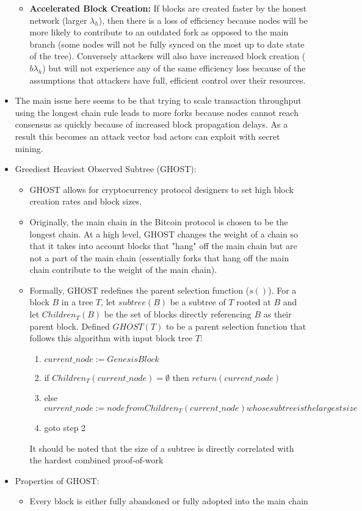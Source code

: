 \documentclass[a4paper]{article}
\begin{document}
\begin{itemize}
\begin{itemize}
\item \textbf{Accelerated Block Creation:} If blocks are created faster by the honest network (larger $\lambda_h$), then there is a loss of efficiency because nodes will be more likely to contribute to an outdated fork as opposed to the main branch (some nodes will not be fully synced on the most up to date state of the tree). Conversely attackers will also have increased block creation ($b\lambda_h$) but will not experience any of the same efficiency loss because of the assumptions that attackers have full, efficient control over their resources.
\end{itemize}

\item The main issue here seems to be that trying to scale transaction throughput using the longest chain rule leads to more forks because nodes cannot reach consensus as quickly because of increased block propagation delays. As a result this becomes an attack vector bad actors can exploit with secret mining.

\item Greediest Heaviest Observed Subtree (GHOST):
\begin{itemize}
\item GHOST allows for cryptocurrency protocol designers to set high block creation rates and block sizes.

\item Originally, the main chain in the Bitcoin protocol is chosen to be the longest chain. At a high level, GHOST changes the weight of a chain so that it takes into account blocks that "hang" off the main chain but are not a part of the main chain (essentially forks that hang off the main chain contribute to the weight of the main chain).

\item Formally, GHOST redefines the parent selection function ($s()$). For a block $B$ in a tree $T$, let $subtree(B)$ be a subtree of $T$ rooted at $B$ and let $Children_T(B)$ be the set of blocks directly referencing $B$ as their parent block. Defined $GHOST(T)$ to be a parent selection function that follows this algorithm with input block tree $T$:
\begin{enumerate}
\item $current\_node := Genesis Block$
\item if $Children_T(current\_node) = \emptyset$ then $return(current\_node)$
\item else $current\_node := node from Children_T(current\_node) whose subtree is the largest size$
\item goto step 2
\end{enumerate}
It should be noted that the size of a subtree is directly correlated with the hardest combined proof-of-work
\end{itemize}
\item Properties of GHOST:
\begin{itemize}
\item Every block is either fully abandoned or fully adopted into the main chain


\end{itemize}
\end{itemize}
\end{document}

